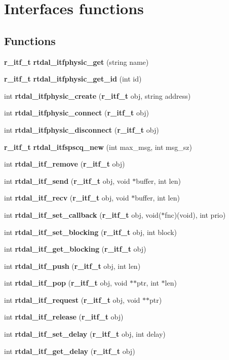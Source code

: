 \section{Interfaces functions}
\label{group__itf}
\subsection*{Functions}
\begin{DoxyCompactItemize}
\item 
{\bf r\-\_\-itf\-\_\-t} {\bf rtdal\-\_\-itfphysic\-\_\-get} (string name)
\item 
{\bf r\-\_\-itf\-\_\-t} {\bf rtdal\-\_\-itfphysic\-\_\-get\-\_\-id} (int id)
\item 
int {\bf rtdal\-\_\-itfphysic\-\_\-create} ({\bf r\-\_\-itf\-\_\-t} obj, string address)
\item 
int {\bf rtdal\-\_\-itfphysic\-\_\-connect} ({\bf r\-\_\-itf\-\_\-t} obj)
\item 
int {\bf rtdal\-\_\-itfphysic\-\_\-disconnect} ({\bf r\-\_\-itf\-\_\-t} obj)
\item 
{\bf r\-\_\-itf\-\_\-t} {\bf rtdal\-\_\-itfspscq\-\_\-new} (int max\-\_\-msg, int msg\-\_\-sz)
\item 
int {\bf rtdal\-\_\-itf\-\_\-remove} ({\bf r\-\_\-itf\-\_\-t} obj)
\item 
int {\bf rtdal\-\_\-itf\-\_\-send} ({\bf r\-\_\-itf\-\_\-t} obj, void $\ast$buffer, int len)
\item 
int {\bf rtdal\-\_\-itf\-\_\-recv} ({\bf r\-\_\-itf\-\_\-t} obj, void $\ast$buffer, int len)
\item 
int {\bf rtdal\-\_\-itf\-\_\-set\-\_\-callback} ({\bf r\-\_\-itf\-\_\-t} obj, void($\ast$fnc)(void), int prio)
\item 
int {\bf rtdal\-\_\-itf\-\_\-set\-\_\-blocking} ({\bf r\-\_\-itf\-\_\-t} obj, int block)
\item 
int {\bf rtdal\-\_\-itf\-\_\-get\-\_\-blocking} ({\bf r\-\_\-itf\-\_\-t} obj)
\item 
int {\bf rtdal\-\_\-itf\-\_\-push} ({\bf r\-\_\-itf\-\_\-t} obj, int len)
\item 
int {\bf rtdal\-\_\-itf\-\_\-pop} ({\bf r\-\_\-itf\-\_\-t} obj, void $\ast$$\ast$ptr, int $\ast$len)
\item 
int {\bf rtdal\-\_\-itf\-\_\-request} ({\bf r\-\_\-itf\-\_\-t} obj, void $\ast$$\ast$ptr)
\item 
int {\bf rtdal\-\_\-itf\-\_\-release} ({\bf r\-\_\-itf\-\_\-t} obj)
\item 
int {\bf rtdal\-\_\-itf\-\_\-set\-\_\-delay} ({\bf r\-\_\-itf\-\_\-t} obj, int delay)
\item 
int {\bf rtdal\-\_\-itf\-\_\-get\-\_\-delay} ({\bf r\-\_\-itf\-\_\-t} obj)
\end{DoxyCompactItemize}


